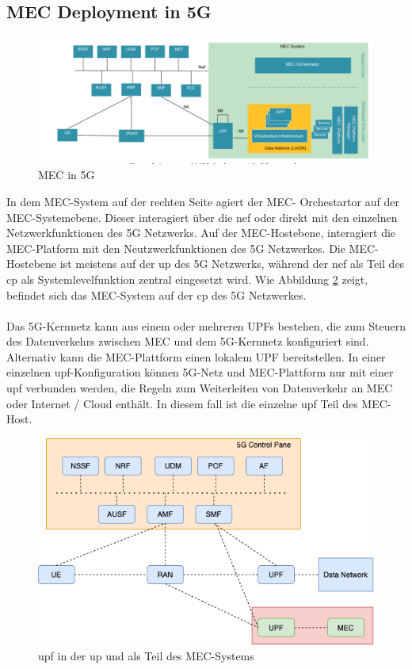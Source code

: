 \documentclass[runningheads]{llncs}
\numberwithin{figure}{section}
\begin{document}
\subsection{MEC Deployment in 5G}
\begin{figure}
  \includegraphics[width=\linewidth]{images/5GMEC-System-Architecture2.png}
  \caption{MEC in 5G \cite{etsiMultiaccessEdgeComputinga}}
  \label{fig:sba2}
\end{figure}
In dem MEC-System auf der rechten Seite agiert der MEC- Orchestartor auf der MEC-Systemebene. Dieser interagiert über die \acrshort{nef} oder
direkt mit den einzelnen Netzwerkfunktionen des 5G Netzwerks. Auf der MEC-Hostebene, interagiert die MEC-Platform mit den Neutzwerkfunktionen des 5G Netzwerkes.
Die MEC-Hostebene ist meistens auf der \acrshort{up} des 5G Netzwerks, während der \acrshort{nef} als Teil des \acrshort{cp} als Systemlevelfunktion zentral eingesetzt wird.
Wie Abbildung \ref{fig:sba2} zeigt, befindet sich das MEC-System auf der \acrshort{cp} des 5G Netzwerkes. 
\\
\\
Das 5G-Kernnetz kann aus einem oder mehreren
UPFs bestehen, die zum Steuern des Datenverkehrs zwischen MEC und dem 5G-Kernnetz konfiguriert sind.
Alternativ kann die MEC-Plattform einen lokalem UPF bereitstellen.
In einer einzelnen \acrfull{upf}-Konfiguration können 5G-Netz und MEC-Plattform nur mit einer \acrfull{upf} verbunden werden, 
die Regeln zum Weiterleiten von Datenverkehr an MEC oder Internet / Cloud enthält. In diesem fall ist die einzelne \acrshort{upf} Teil des 
MEC-Host.
\begin{figure}
  \includegraphics[width=\linewidth]{images/5g-scenarios.png}
  \caption{\acrshort{upf} in der \acrshort{up} und als Teil des MEC-Systems}
  \label{fig:sba2}
\end{figure}
\end{document}

